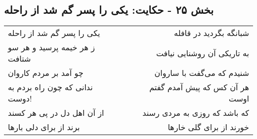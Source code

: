 \begin{center}
\section*{بخش ۲۵ - حکایت: یکی را پسر گم شد از راحله}
\label{sec:025}
\begin{longtable}{l p{0.5cm} r}
یکی را پسر گم شد از راحله
&&
شبانگه بگردید در قافله
\\
ز هر خیمه پرسید و هر سو شتافت
&&
به تاریکی آن روشنایی نیافت
\\
چو آمد بر مردم کاروان
&&
شنیدم که می‌گفت با ساروان
\\
ندانی که چون راه بردم به دوست!
&&
هر آن کس که پیش آمدم گفتم اوست
\\
از آن اهل دل در پی هر کسند
&&
که باشد که روزی به مردی رسند
\\
برند از برای دلی بارها
&&
خورند از برای گلی خارها
\\
\end{longtable}
\end{center}
